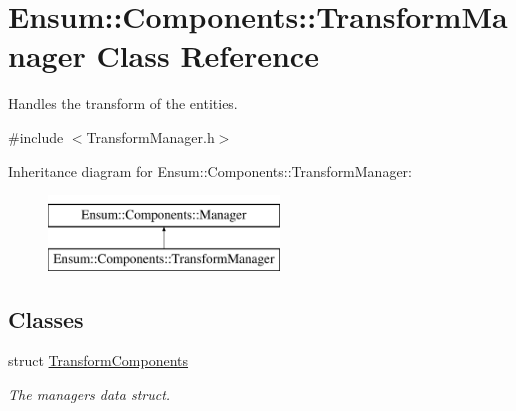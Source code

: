 \hypertarget{class_ensum_1_1_components_1_1_transform_manager}{}\section{Ensum\+:\+:Components\+:\+:Transform\+Manager Class Reference}
\label{class_ensum_1_1_components_1_1_transform_manager}


Handles the transform of the entities.  




{\ttfamily \#include $<$Transform\+Manager.\+h$>$}

Inheritance diagram for Ensum\+:\+:Components\+:\+:Transform\+Manager\+:\begin{figure}[H]
\begin{center}
\leavevmode
\includegraphics[height=2.000000cm]{class_ensum_1_1_components_1_1_transform_manager}
\end{center}
\end{figure}
\subsection*{Classes}
\begin{DoxyCompactItemize}
\item 
struct \hyperlink{struct_ensum_1_1_components_1_1_transform_manager_1_1_transform_components}{Transform\+Components}
\begin{DoxyCompactList}\small\item\em The managers data struct. \end{DoxyCompactList}\end{DoxyCompactItemize}
